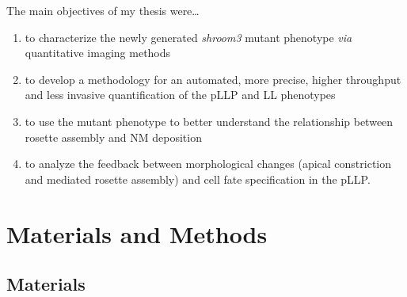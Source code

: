 \documentclass[10pt, b5paper, singlespacinge, twoside]{reedthesis} %
\providecommand{\tightlist}{%
  \setlength{\itemsep}{0pt}\setlength{\parskip}{0pt}}
\theoremstyle{definition}
\theoremstyle{definition}
\theoremstyle{definition}
\theoremstyle{remark}
\begin{document}
The main objectives of my thesis were\ldots{}
\begin{enumerate}
\def\labelenumi{\arabic{enumi}.}
\tightlist
\item
  to characterize the newly generated \emph{shroom3} mutant phenotype \emph{via} quantitative imaging methods
\item
  to develop a methodology for an automated, more precise, higher throughput and less invasive quantification of the pLLP and LL phenotypes
\item
  to use the mutant phenotype to better understand the relationship between rosette assembly and NM deposition
\item
  to analyze the feedback between morphological changes (apical constriction and mediated rosette assembly) and cell fate specification in the pLLP.
\end{enumerate}
\hypertarget{mat-met}{%
\chapter{Materials and Methods}\label{mat-met}}

\hypertarget{mat}{%
\section{Materials}\label{mat}}
\end{document}
